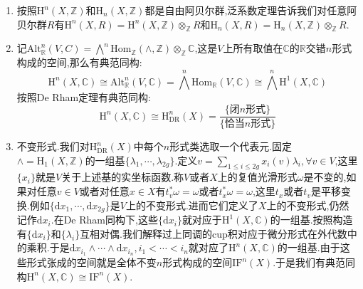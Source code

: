 \begin{enumerate}
\begin{proof}
		我们要证明的是对任意正整数$m$有如下典范映射是同构:
		$$\gamma_m^n:\bigwedge^n\mathrm{H}^1(S_1^m,\mathbb{Z})\to\mathrm{H}^n(S_1^m,\mathbb{Z})$$
		为此我们对$m$做归纳,$m=1$时$S_1$的$\mathbb{Z}$系数上同调环是$\mathbb{Z}[x]/(x^2)$,此时同构是直接的.下面设$m>1$,设对任意$p<m$有$\gamma_p^n$是同构.按照K\"unneth公式和cup积可交换,有如下交换图表:
		$$\xymatrix{\oplus_{p+q=n}\left(\bigwedge^p\mathrm{H}^1(S_1^{m-1,\mathbb{Z}}\otimes\bigwedge^q\mathrm{H}^1(S_1,\mathbb{Z}))\right)\ar[rr]^{\gamma}\ar@{=}[d]&&\oplus_{p+q=n}\left(\mathrm{H}^p(S_1^{m-1},\mathbb{Z})\otimes\mathrm{H}^q(S_1,\mathbb{Z})\right)\ar[dd]_{\beta_m}\\\bigwedge^n\left(\mathrm{H}^1(S_1^{m-1},\mathbb{Z})\oplus\mathrm{H}^1(S_1,\mathbb{Z})\right)\ar[d]_{\alpha_m}&&\\\bigwedge^n\mathrm{H}^1(S_1^m,\mathbb{Z})\ar[rr]^{\gamma_m^n}&&\mathrm{H}^n(S_1^m,\mathbb{Z})}$$
		按照归纳假设,有$\gamma$是同构,按照$\mathrm{H}^p(S_1^{m-1},\mathbb{Z})$和$\mathrm{H}^q(S_1,\mathbb{Z})$都是自由阿贝尔群,从K\"unneth公式得到$\alpha_m$和$\beta_m$都是同构.于是图表交换得到$\gamma_m^n$是同构.
	\end{proof}
    \item 按照$\mathrm{H}^n(X,\mathbb{Z})$和$\mathrm{H}_n(X,\mathbb{Z})$都是自由阿贝尔群,泛系数定理告诉我们对任意阿贝尔群$R$有$\mathrm{H}^n(X,R)=\mathrm{H}^n(X,\mathbb{Z})\otimes_{\mathbb{Z}}R$和$\mathrm{H}_n(X,R)=\mathrm{H}_n(X,\mathbb{Z})\otimes_{\mathbb{Z}}R$.
    \item 记$\mathrm{Alt}^n_{\mathbb{R}}(V,C)=\bigwedge^n\mathrm{Hom}_{\mathbb{Z}}(\wedge,\mathbb{Z})\otimes_{\mathbb{Z}}\mathbb{C}$,这是$V$上所有取值在$\mathbb{C}$的$\mathbb{R}$交错$n$形式构成的空间,那么有典范同构:
    $$\mathrm{H}^n(X,\mathbb{C})\cong\mathrm{Alt}_{\mathbb{R}}^n(V,\mathbb{C})=\bigwedge^n\mathrm{Hom}_{\mathbb{R}}(V,\mathbb{C})\cong\bigwedge^n\mathrm{H}^1(X,\mathbb{C})$$
    按照De Rham定理有典范同构:
    $$\mathrm{H}^n(X,\mathbb{C})\cong\mathrm{H}^n_{\mathrm{DR}}(X)=\frac{\{\text{闭}n\text{形式}\}}{\{\text{恰当}n\text{形式}\}}$$
    \item 不变形式.我们对$\mathrm{H}^n_{\mathrm{DR}}(X)$中每个$n$形式类选取一个代表元.固定$\wedge=\mathrm{H}_1(X,\mathbb{Z})$的一组基$\{\lambda_1,\cdots,\lambda_{2g}\}$.定义$v=\sum_{1\le i\le2g}x_i(v)\lambda_i,\forall v\in V$,这里$\{x_i\}$就是$V$关于上述基的实坐标函数.称$V$或者$X$上的复值光滑形式$\omega$是不变的,如果对任意$v\in V$或者对任意$x\in X$有$t_v^*\omega=\omega$或者$t_x^*\omega=\omega$,这里$t_x$或者$t_v$是平移变换.例如$\{\mathrm{d}x_1,\cdots,\mathrm{d}x_{2g}\}$是$V$上的不变形式.进而它们定义了$X$上的不变形式,仍然记作$\mathrm{d}x_i$.在De Rham同构下,这些$\{\mathrm{d}x_i\}$就对应于$\mathrm{H}^1(X,\mathbb{C})$的一组基.按照构造有$\{\mathrm{d}x_i\}$和$\{\lambda_i\}$互相对偶.我们解释过上同调的cup积对应于微分形式在外代数中的乘积.于是$\mathrm{d}x_{i_1}\wedge\cdots\wedge\mathrm{d}x_{i_n},i_1<\cdots<i_n$就对应了$\mathrm{H}^n(X,\mathbb{C})$的一组基.由于这些形式张成的空间就是全体不变$n$形式构成的空间$\mathrm{IF}^n(X)$.于是我们有典范同构$\mathrm{H}^n(X,\mathbb{C})\cong\mathrm{IF}^n(X)$.
\end{enumerate}
